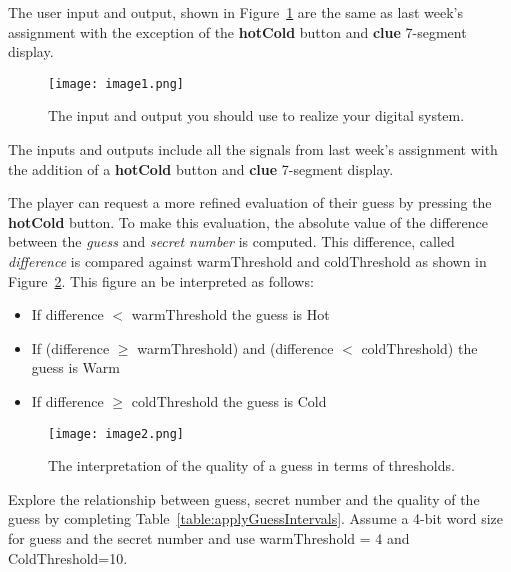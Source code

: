 The user input and output, shown in Figure~\ref{fig:iOonDevBorad} are the same as last week's
assignment with the exception of the \textbf{hotCold} button and
\textbf{clue} 7-segment display.

\begin{figure}[ht]
    \texttt{[image:  image1.png]}
    \caption{The input and output you should use to realize your digital system.}
    \label{fig:iOonDevBorad}
\end{figure}

The inputs and outputs include all the signals from last week's assignment
with the addition of a \textbf{hotCold} button and \textbf{clue} 7-segment
display.

The player can request a more refined evaluation of their guess by
pressing the \textbf{hotCold} button. To make this evaluation, the
absolute value of the difference between the \emph{guess} and
\emph{secret number} is computed.  This difference, called
\emph{difference} is compared against warmThreshold
and coldThreshold as shown in Figure~\ref{fig:guessThreshold}.
This figure an be interpreted as follows:

\begin{itemize}
    \item
        If difference $<$ warmThreshold the guess is Hot
    \item
        If (difference $\geq$ warmThreshold) and (difference $<$ coldThreshold) the guess is Warm
    \item
        If difference $\geq$ coldThreshold the guess is Cold
\end{itemize}

\begin{figure}[ht]
    \texttt{[image:  image2.png]}
    \caption{The interpretation of the quality of a guess in terms of thresholds.}
    \label{fig:guessThreshold}
\end{figure}

Explore the relationship
between guess, secret number and the quality of the guess by completing
Table~\ref{table:applyGuessIntervals}. Assume a 4-bit word size for guess
and the secret number and use warmThreshold = 4 and ColdThreshold=10.

